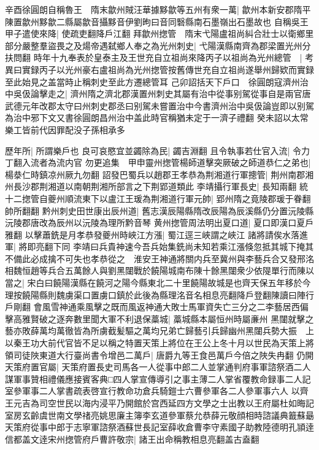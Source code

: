 辛酉徐圓朗自稱魯王　隋末歙州賊汪華據黟歙等五州有衆一萬|{
	歙州本新安郡隋平陳置歙州黟歙二縣屬歙音攝黟音伊劉昫曰音同䃜縣南石墨嶺出石墨故也}
自稱吳王甲子遣使來降|{
	使疏吏翻降戶江翻}
拜歙州揔管　隋末弋陽盧祖尚糾合壯士以衛鄉里部分嚴整羣盜畏之及煬帝遇弑鄉人奉之為光州刺史|{
	弋陽漢縣南齊為郡梁置光州分扶問翻}
時年十九奉表於皇泰主及王世充自立祖尚來降丙子以祖尚為光州總管　|{
	考異曰實録丙子以光州豪右盧祖尚為光州揔管按舊傳世充自立祖尚遂舉州歸欵而實録至此始見之盖當時止稱刺史至此方遷總管耳}
己卯詔括天下戶口　徐圓朗寇濟州治中吳伋論擊走之|{
	濟州隋之濟北郡漢置州刺史其屬有治中從事别駕從事自是兩官唐武德元年改郡太守曰州刺史郡丞曰别駕未嘗置治中今書濟州治中吳伋論豈即以别駕為治中邪下文又書徐圓朗昌州治中盖此時官稱猶未定于一濟子禮翻}
癸未詔以太常樂工皆前代因罪配没子孫相承多

歷年所|{
	所謂樂戶也}
良可哀愍宜並蠲除為民|{
	蠲吉淵翻}
且令執事若仕官入流|{
	令力丁翻入流者為流内官}
勿更追集　甲申靈州揔管楊師道擊突厥破之師道恭仁之弟也|{
	楊㳟仁時鎮凉州厥九勿翻}
詔發巴蜀兵以趙郡王孝恭為荆湘道行軍摠管|{
	荆州南郡湘州長沙郡荆湘道以南朝荆湘所部言之下荆郢道類此}
李靖攝行軍長史|{
	長知兩翻}
統十二揔管自夔州順流東下以盧江王瑗為荆湘道行軍元帥|{
	郢州隋之竟陵郡瑗于眷翻帥所翻翻}
黔州刺史田世康出辰州道|{
	舊志漢辰陽縣隋改辰陽為辰溪縣仍分置沅陵縣沅陵郡唐改為辰州以沅陵為理所黔音琴}
黄州揔管周法明出夏口道|{
	夏口即漢口夏戶雅翻}
以擊蕭銑是月孝恭發夔州時峽江方漲|{
	蜀江逕三峽謂之峽江}
諸將請俟水落進軍|{
	將即亮翻下同}
李靖曰兵貴神速今吾兵始集銑尚未知若乘江漲倏忽抵其城下掩其不備此必成擒不可失也孝恭從之　淮安王神通將關内兵至冀州與李藝兵合又發邢洺相魏恒趙等兵合五萬餘人與劉黑闥戰於饒陽城南布陳十餘黑闥衆少依隄單行而陳以當之|{
	宋白曰饒陽漢縣在饒河之陽今縣東北二十里饒陽故城是也齊天保五年移於今理按饒陽縣則魏虜渠口置虜口鎮於此後為縣理洺音名相息亮翻降戶登翻陳讀曰陣行戶剛翻}
會風雪神通乘風擊之既而風返神通大敗士馬軍資失亡三分之二李藝居西偏擊高雅賢破之逐奔數里聞大軍不利退保藁城|{
	藁城縣本屬恒州時屬亷州}
黑闥就擊之藝亦敗薛萬均萬徹皆為所虜截髪驅之萬均兄弟亡歸藝引兵歸幽州黑闥兵勢大振　上以秦王功大前代官皆不足以稱之特置天策上將位在王公上冬十月以世民為天策上將領司徒陜東道大行臺尚書令增邑二萬戶|{
	唐爵九等王食邑萬戶今倍之陜失冉翻}
仍開天策府置官屬|{
	天策府置長史司馬各一人從事中郎二人並掌通判府事軍諮祭酒二人謀軍事贊相禮儀應接賓客典□四人掌宣傳導引之事主薄二人掌省覆教命録事二人記室參軍事二人掌書疏表啓宣行教命功倉兵騎鎧士六曹參軍各二人參軍事六人}
以齊王元吉為司空世民以海内浸平乃開館於宫西延四方文學之士出教以王府屬杜如晦記室房玄齡虞世南文學禇亮姚思廉主簿李玄道參軍蔡允恭薛元敬顔相時諮議典籖蘇朂天策府從事中郎于志寧軍諮祭酒蘇世長記室薛收倉曹李守素國子助教陸德明孔頴逹信都盖文逹宋州揔管府戶曹許敬宗|{
	諸王出命稱教相息亮翻盖古盍翻}
